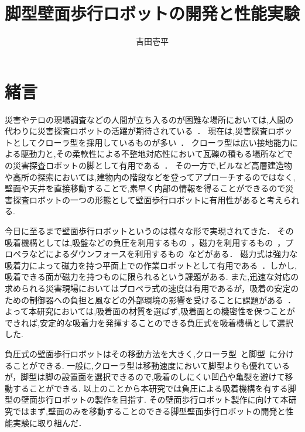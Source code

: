 \documentclass[uplatex,dvipdfmx]{jlreq}
\title{脚型壁面歩行ロボットの開発と性能実験}
\author{吉田壱平}
\begin{document}
\maketitle
\thispagestyle{empty}
\section{緒言}
災害やテロの現場調査などの人間が立ち入るのが困難な場所においては,人間の代わりに災害探査ロボットの活躍が期待されている~\cite{大須賀公一2004ヘビ型ロボットによる狭空間探索}．
現在は,災害探査ロボットとしてクローラ型を採用しているものが多い~\cite{高森年2003災害における罹災者発見とクローラ型ロボット,久武経夫2011大災害に立ち向かうロボットの開発}．
クローラ型は広い接地能力による駆動力と,その柔軟性による不整地対応性において瓦礫の積もる場所などでの災害探査ロボットの脚として有用である~\cite{小柳栄次2010サブクローラを持つレスキューロボット}．
その一方で,ビルなど高層建造物や高所の探索においては,建物内の階段などを登ってアプローチするのではなく,壁面や天井を直接移動することで,素早く内部の情報を得ることができるので災害探査ロボットの一つの形態として壁面歩行ロボットに有用性があると考えられる.

今日に至るまで壁面歩行ロボットというのは様々な形で実現されてきた．
その吸着機構としては,吸盤などの負圧を利用するもの~\cite{広瀬茂男1991四足壁面移動ロボット}，磁力を利用するもの~\cite{高田洋吾2013立体的な環境で活動できる橋梁検査ロボットの開発}，プロペラなどによるダウンフォースを利用するもの~\cite{weko_4205_1}などがある．
磁力式は強力な吸着力によって磁力を持つ平面上での作業ロボットとして有用である~\cite{高田洋吾2013立体的な環境で活動できる橋梁検査ロボットの開発}．しかし,吸着できる面が磁力を持つものに限られるという課題がある.
また,迅速な対応の求められる災害現場においてはプロペラ式の速度は有用であるが\cite{weko_4205_1}，吸着の安定のための制御器への負担と風などの外部環境の影響を受けることに課題がある~\cite{西亮1991推進力による壁面移動ロボットの研究,鈴木隆宏2009g1501}．
よって本研究においては,吸着面の材質を選ばず,吸着面との機密性を保つことができれば,安定的な吸着力を発揮することのできる負圧式を吸着機構として選択した.

負圧式の壁面歩行ロボットはその移動方法を大きく,クローラ型~\cite{福田敏男1994壁面走行ロボットの研究}と脚型~\cite{広瀬茂男1991四足壁面移動ロボット}に分けることができる.
一般に,クローラ型は移動速度において脚型よりも優れているが\cite{福田敏男1992壁面走行ロボッ}，脚型は脚の設置面を選択できるので,吸着のしにくい凹凸や亀裂を避けて移動することができる.
以上のことから本研究では負圧による吸着機構を有する脚型の壁面歩行ロボットの製作を目指す.
その壁面歩行ロボット製作に向けて本研究ではまず,壁面のみを移動することのできる脚型壁面歩行ロボットの開発と性能実験に取り組んだ．
\end{document}
